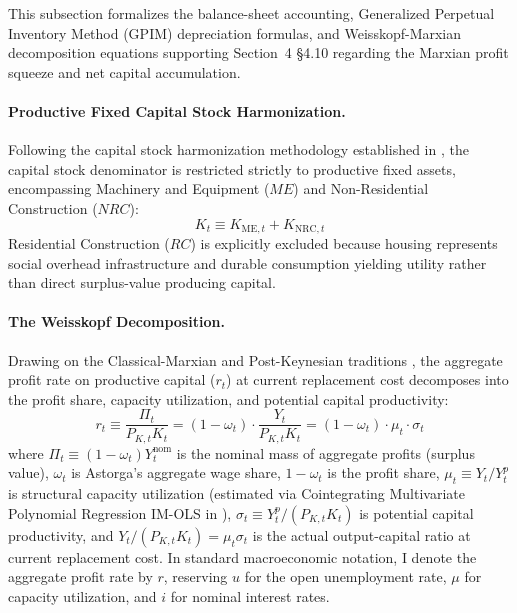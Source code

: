 This subsection formalizes the balance-sheet accounting, Generalized Perpetual Inventory Method (GPIM) depreciation formulas, and Weisskopf-Marxian decomposition equations supporting Section~4 §4.10 regarding the Marxian profit squeeze and net capital accumulation.

\paragraph{Productive Fixed Capital Stock Harmonization.}
Following the capital stock harmonization methodology established in \citet{Polanco2026}, the capital stock denominator is restricted strictly to productive fixed assets, encompassing Machinery and Equipment ($ME$) and Non-Residential Construction ($NRC$):
\begin{equation}
	K_t \equiv K_{\text{ME}, t} + K_{\text{NRC}, t}
	\label{eq:k_definition_app}
\end{equation}
Residential Construction ($RC$) is explicitly excluded because housing represents social overhead infrastructure and durable consumption yielding utility rather than direct surplus-value producing capital.

\paragraph{The Weisskopf Decomposition.}
Drawing on the Classical-Marxian and Post-Keynesian traditions \citep{Weisskopf1979,Foley1982,Basu2022}, the aggregate profit rate on productive capital ($r_t$) at current replacement cost decomposes into the profit share, capacity utilization, and potential capital productivity:
\begin{equation}
	r_t \equiv \frac{\Pi_t}{P_{K, t} K_t} = (1 - \omega_t) \cdot \frac{Y_t}{P_{K, t} K_t} = (1 - \omega_t) \cdot \mu_t \cdot \sigma_t
	\label{eq:profit_rate_weisskopf_app}
\end{equation}
where $\Pi_t \equiv (1 - \omega_t) Y^{\text{nom}}_t$ is the nominal mass of aggregate profits (surplus value), $\omega_t$ is Astorga's \citeyearpar{Astorga2023} aggregate wage share, $1 - \omega_t$ is the profit share, $\mu_t \equiv Y_t / Y^p_t$ is structural capacity utilization (estimated via Cointegrating Multivariate Polynomial Regression IM-OLS in \citealt{Polanco2026}), $\sigma_t \equiv Y^p_t / (P_{K, t} K_t)$ is potential capital productivity, and $Y_t / (P_{K, t} K_t) = \mu_t \sigma_t$ is the actual output-capital ratio at current replacement cost. In standard macroeconomic notation, I denote the aggregate profit rate by $r$, reserving $u$ for the open unemployment rate, $\mu$ for capacity utilization, and $i$ for nominal interest rates.

